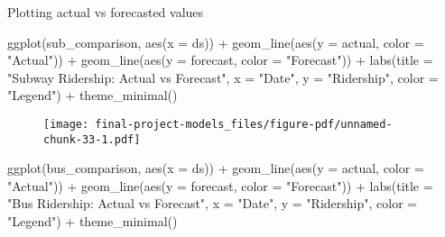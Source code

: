 \documentclass[
  letterpaper,
  DIV=11,
  numbers=noendperiod]{scrartcl}
\newenvironment{Shaded}{\begin{snugshade}}{\end{snugshade}}
\newcommand{\AttributeTok}[1]{\textcolor[rgb]{0.40,0.45,0.13}{#1}}
\newcommand{\FunctionTok}[1]{\textcolor[rgb]{0.28,0.35,0.67}{#1}}
\newcommand{\NormalTok}[1]{\textcolor[rgb]{0.00,0.23,0.31}{#1}}
\newcommand{\SpecialCharTok}[1]{\textcolor[rgb]{0.37,0.37,0.37}{#1}}
\newcommand{\StringTok}[1]{\textcolor[rgb]{0.13,0.47,0.30}{#1}}
\begin{document}
Plotting actual vs forecasted values

\begin{Shaded}
\begin{Highlighting}[]
\FunctionTok{ggplot}\NormalTok{(sub\_comparison, }\FunctionTok{aes}\NormalTok{(}\AttributeTok{x =}\NormalTok{ ds)) }\SpecialCharTok{+}
  \FunctionTok{geom\_line}\NormalTok{(}\FunctionTok{aes}\NormalTok{(}\AttributeTok{y =}\NormalTok{ actual, }\AttributeTok{color =} \StringTok{"Actual"}\NormalTok{)) }\SpecialCharTok{+}
  \FunctionTok{geom\_line}\NormalTok{(}\FunctionTok{aes}\NormalTok{(}\AttributeTok{y =}\NormalTok{ forecast, }\AttributeTok{color =} \StringTok{"Forecast"}\NormalTok{)) }\SpecialCharTok{+}
  \FunctionTok{labs}\NormalTok{(}\AttributeTok{title =} \StringTok{"Subway Ridership: Actual vs Forecast"}\NormalTok{,}
       \AttributeTok{x =} \StringTok{"Date"}\NormalTok{,}
       \AttributeTok{y =} \StringTok{"Ridership"}\NormalTok{,}
       \AttributeTok{color =} \StringTok{"Legend"}\NormalTok{) }\SpecialCharTok{+}
  \FunctionTok{theme\_minimal}\NormalTok{()}
\end{Highlighting}
\end{Shaded}

\begin{figure}[H]

{\centering \texttt{[image: final-project-models\_files/figure-pdf/unnamed-chunk-33-1.pdf]}

}

\end{figure}

\begin{Shaded}
\begin{Highlighting}[]
\FunctionTok{ggplot}\NormalTok{(bus\_comparison, }\FunctionTok{aes}\NormalTok{(}\AttributeTok{x =}\NormalTok{ ds)) }\SpecialCharTok{+}
  \FunctionTok{geom\_line}\NormalTok{(}\FunctionTok{aes}\NormalTok{(}\AttributeTok{y =}\NormalTok{ actual, }\AttributeTok{color =} \StringTok{"Actual"}\NormalTok{)) }\SpecialCharTok{+}
  \FunctionTok{geom\_line}\NormalTok{(}\FunctionTok{aes}\NormalTok{(}\AttributeTok{y =}\NormalTok{ forecast, }\AttributeTok{color =} \StringTok{"Forecast"}\NormalTok{)) }\SpecialCharTok{+}
  \FunctionTok{labs}\NormalTok{(}\AttributeTok{title =} \StringTok{"Bus Ridership: Actual vs Forecast"}\NormalTok{,}
       \AttributeTok{x =} \StringTok{"Date"}\NormalTok{,}
       \AttributeTok{y =} \StringTok{"Ridership"}\NormalTok{,}
       \AttributeTok{color =} \StringTok{"Legend"}\NormalTok{) }\SpecialCharTok{+}
  \FunctionTok{theme\_minimal}\NormalTok{()}
\end{Highlighting}
\end{Shaded}
\end{document}

